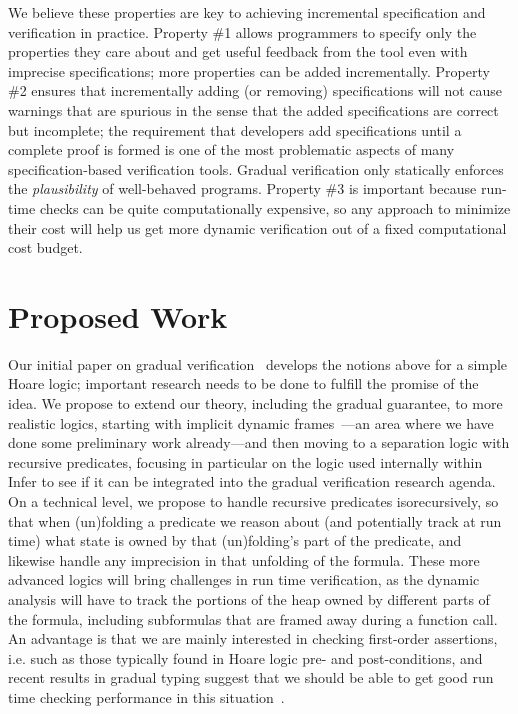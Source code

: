 \documentclass[10pt,twocolumn]{article}
\begin{document}
\begin{sloppypar}
\begin{enumerate}[leftmargin=1em]
\end{enumerate}

We believe these properties are key to achieving incremental specification and verification in practice.  Property \#1 allows programmers to specify only the properties they care about and get useful feedback from the tool even with imprecise specifications; more properties can be added incrementally.  Property \#2 ensures that incrementally adding (or removing) specifications will not cause warnings that are spurious in the sense that the added specifications are correct but incomplete; the requirement that developers add specifications until a complete proof is formed is one of the most problematic aspects of many specification-based verification tools. Gradual verification only statically enforces the {\em plausibility} of well-behaved programs. Property \#3 is important because run-time checks can be quite computationally expensive, so any approach to minimize their cost will help us get more dynamic verification out of a fixed computational cost budget.


\section{Proposed Work}
\vspace{-2ex}

Our initial paper on gradual verification~\cite{baderAl:vmcai2018} develops the notions above for a simple Hoare logic; important research needs to be done to fulfill the promise of the idea.
We propose to extend our theory, including the gradual guarantee, to more realistic logics, starting with implicit dynamic frames~\cite{smansAl:toplas2012}---an area where we have done some preliminary work already---and then moving to a separation logic with recursive predicates, focusing in particular on the logic used internally within Infer to see if it can be integrated into the gradual verification research agenda.
On a technical level, we propose to handle recursive predicates isorecursively, so that when (un)folding a predicate we reason about (and potentially track at run time) what state is owned by that (un)folding's part of the predicate, and likewise handle any imprecision in that unfolding of the formula.
These more advanced logics will bring challenges in run time verification, as the dynamic analysis will have to track the portions of the heap owned by different parts of the formula, including subformulas that are framed away during a function call.
An advantage is that we are mainly interested in checking first-order assertions, i.e. such as those typically found in Hoare logic pre- and post-conditions, and recent results in gradual typing suggest that we should be able to get good run time checking performance in this situation~\cite{muehlboeckTate:oopsla2017}.


\end{sloppypar}
\end{document}
